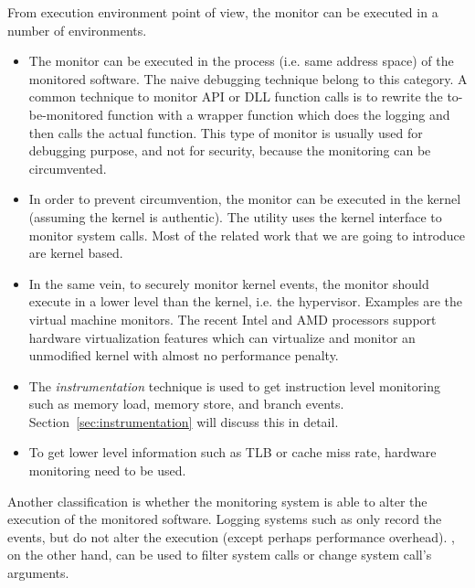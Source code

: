  From execution environment point of view, the monitor can be executed
in a number of environments.
\begin{itemize}
\item The monitor can be executed in the process (i.e. same address space)
of the monitored software.
The naive  debugging technique belong to this category.
A common technique to monitor API or DLL function calls is to rewrite
the to-be-monitored function with a wrapper function which does the
logging and then calls the actual function.
This type of monitor is usually used for debugging purpose, and not for
security, because the monitoring can be circumvented.
\item In order to prevent circumvention,
the monitor can be executed in the kernel (assuming the kernel is authentic).
The  utility uses the kernel  interface
to monitor system calls.
Most of the related work that we are going to introduce are kernel based.
\item In the same vein, to securely monitor kernel events, the monitor
should execute in a lower level than the kernel, i.e. the hypervisor.
Examples are the virtual machine monitors.
The recent Intel and AMD processors support hardware virtualization
features which can virtualize and monitor an unmodified kernel with almost
no performance penalty.
\item The {\em instrumentation} technique is used to get instruction
level monitoring such as memory load, memory store, and branch events.
Section~\ref{sec:instrumentation} will discuss this in detail.
\item To get lower level information such as TLB or cache miss rate,
hardware monitoring need to be used.
\end{itemize}

Another classification is whether the monitoring system is able to
alter the execution of the monitored software.
Logging systems such as  only record the events,
but do not alter the execution (except perhaps performance overhead).
, on the other hand, can be used to filter system calls
or change system call's arguments.

